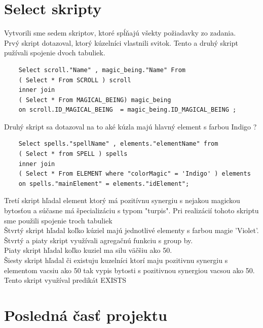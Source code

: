 \documentclass{article}
\begin{document}
    \section{Select skripty}
    \Large{Vytvorili sme sedem skriptov, ktoré spĺňajú všekty požiadavky zo zadania.}\\
    \Large{Prvý skript dotazoval, ktorý kúzelníci vlastnili svitok. Tento a druhý skript pužívali spojenie dvoch tabuliek.}
    \begin{verbatim}
    Select scroll."Name" , magic_being."Name" From
    ( Select * From SCROLL ) scroll
    inner join
    ( Select * From MAGICAL_BEING) magic_being
    on scroll.ID_MAGICAL_BEING  = magic_being.ID_MAGICAL_BEING ;
    \end{verbatim}
    \Large{Druhý skript sa dotazoval na to aké kúzla majú hlavný element s farbou Indigo ?}
    \begin{verbatim}
    Select spells."spellName" , elements."elementName" from
    ( Select * from SPELL ) spells
    inner join
    ( Select * From ELEMENT where "colorMagic" = 'Indigo' ) elements
    on spells."mainElement" = elements."idElement";
    \end{verbatim}
    \Large{Tretí skript hľadal element ktorý má pozitívnu synergiu s nejakou magickou bytosťou a súčasne má špecializáciu s typom "turpis". Pri realizácií tohoto skriptu sme použili spojenie troch tabuliek}\\
    \Large{Štvrtý skript hľadal koľko kúziel majú jednotlivé elementy s farbou magie 'Violet'. Štvrtý a piaty skript využívali agregačnú funkciu s group by.}\\
    \Large{Piaty skript hľadal koľko kuziel ma silu väčšiu ako 50.}\\
    \Large{Šiesty skript hľadal či existuju kuzelníci ktorí maju pozitivnu synergiu s elementom vacsiu ako 50 tak vypis bytosti s
    pozitivnou synergiou vacsou ako 50. Tento skript využíval predikát EXISTS}\\
    \newpage
    \section{Posledná časť projektu}
\end{document}
